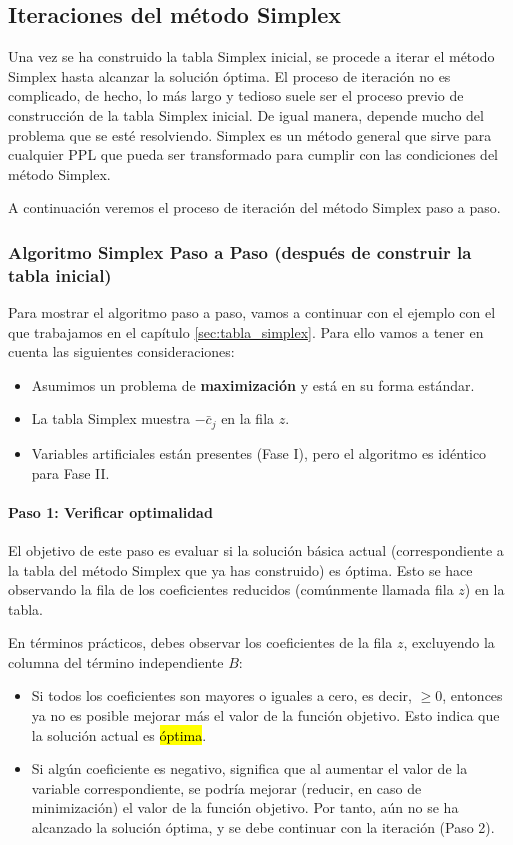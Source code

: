 \subsection{Iteraciones del método Simplex}
\label{sec:iteraciones_simplex}

Una vez se ha construido la tabla Simplex inicial, se procede a iterar el método Simplex hasta alcanzar la solución óptima. El proceso de iteración no es complicado, de hecho, lo más largo y tedioso suele ser el proceso previo de construcción de la tabla Simplex inicial. De igual manera, depende mucho del problema que se esté resolviendo. Simplex es un método general que sirve para cualquier PPL que pueda ser transformado para cumplir con las condiciones del método Simplex.

A continuación veremos el proceso de iteración del método Simplex paso a paso.

\subsubsection{Algoritmo Simplex Paso a Paso (después de construir la tabla inicial)}
Para mostrar el algoritmo paso a paso, vamos a continuar con el ejemplo con el que trabajamos en el capítulo \ref{sec:tabla_simplex}. Para ello vamos a tener en cuenta las siguientes consideraciones:
\begin{itemize}
  \item Asumimos un problema de \textbf{maximización} y está en su forma estándar.
  \item La tabla Simplex muestra \(-\bar{c}_j\) en la fila \(z\).
  \item Variables artificiales están presentes (Fase I), pero el algoritmo es idéntico para Fase II.
\end{itemize}

\paragraph{Paso 1: Verificar optimalidad}

El objetivo de este paso es evaluar si la solución básica actual (correspondiente a la tabla del método Simplex que ya has construido) es óptima. Esto se hace observando la fila de los coeficientes reducidos (comúnmente llamada fila \(z\)) en la tabla.

En términos prácticos, debes observar los coeficientes de la fila \(z\), excluyendo la columna del término independiente \(B\):
\begin{itemize}
  \item Si todos los coeficientes son mayores o iguales a cero, es decir, \(\geq 0\), entonces ya no es posible mejorar más el valor de la función objetivo. Esto indica que la solución actual es \hl{óptima}.
  \item Si algún coeficiente es negativo, significa que al aumentar el valor de la variable correspondiente, se podría mejorar (reducir, en caso de minimización) el valor de la función objetivo. Por tanto, aún no se ha alcanzado la solución óptima, y se debe continuar con la iteración (Paso 2).
\end{itemize}

